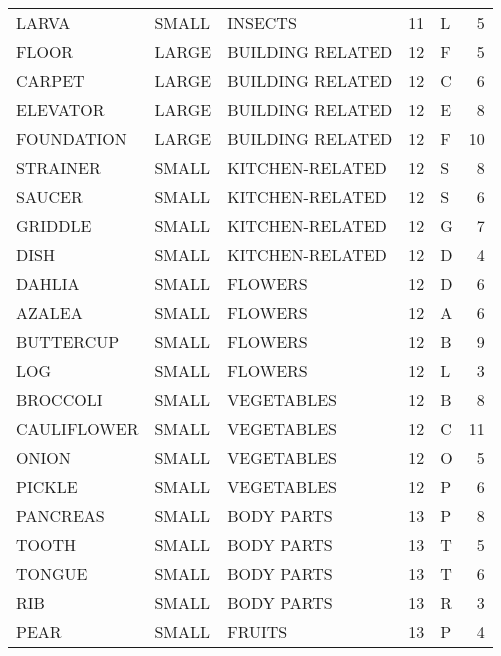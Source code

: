 \begin{tabular}{lllrlr}
       LARVA & SMALL &          INSECTS &       11 &            L &       5 \\
       FLOOR & LARGE & BUILDING RELATED &       12 &            F &       5 \\
      CARPET & LARGE & BUILDING RELATED &       12 &            C &       6 \\
    ELEVATOR & LARGE & BUILDING RELATED &       12 &            E &       8 \\
  FOUNDATION & LARGE & BUILDING RELATED &       12 &            F &      10 \\
    STRAINER & SMALL &  KITCHEN-RELATED &       12 &            S &       8 \\
      SAUCER & SMALL &  KITCHEN-RELATED &       12 &            S &       6 \\
     GRIDDLE & SMALL &  KITCHEN-RELATED &       12 &            G &       7 \\
        DISH & SMALL &  KITCHEN-RELATED &       12 &            D &       4 \\
      DAHLIA & SMALL &          FLOWERS &       12 &            D &       6 \\
      AZALEA & SMALL &          FLOWERS &       12 &            A &       6 \\
   BUTTERCUP & SMALL &          FLOWERS &       12 &            B &       9 \\
         LOG & SMALL &          FLOWERS &       12 &            L &       3 \\
    BROCCOLI & SMALL &       VEGETABLES &       12 &            B &       8 \\
 CAULIFLOWER & SMALL &       VEGETABLES &       12 &            C &      11 \\
       ONION & SMALL &       VEGETABLES &       12 &            O &       5 \\
      PICKLE & SMALL &       VEGETABLES &       12 &            P &       6 \\
    PANCREAS & SMALL &       BODY PARTS &       13 &            P &       8 \\
       TOOTH & SMALL &       BODY PARTS &       13 &            T &       5 \\
      TONGUE & SMALL &       BODY PARTS &       13 &            T &       6 \\
         RIB & SMALL &       BODY PARTS &       13 &            R &       3 \\
        PEAR & SMALL &           FRUITS &       13 &            P &       4 \\

\end{tabular}
